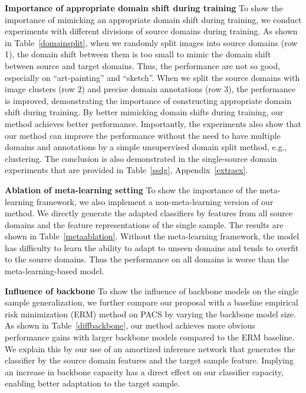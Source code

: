 \documentclass{article} \usepackage[table]{xcolor}
\begin{document}
\textbf{Importance of appropriate domain shift during training}
To show the importance of mimicking an appropriate domain shift during training, we conduct experiments with different divisions of source domains during training. 
As shown in Table~\ref{domainsplit}, when we randomly split images into source domains (row 1), the domain shift between them is too small to mimic the domain shift between source and target domains. Thus, the performance are not so good, especially on ``art-painting'' and ``sketch''.
When we split the source domains with image clusters (row 2) and precise domain annotations (row 3), the performance is improved,
demonstrating the importance of constructing appropriate domain shift during training.
By better mimicking domain shifts during training, our method achieves better performance.
Importantly, the experiments also show that our method can improve the performance without the need to have multiple domains and annotations by a simple unsupervised domain split method, e.g., clustering. 
The conclusion is also demonstrated in the single-source domain experiments that are provided in Table~\ref{ssdg}, Appendix~\ref{extraex}.




\textbf{Ablation of meta-learning setting}
To show the importance of the meta-learning framework, we also implement a non-meta-learning version of our method.
We directly generate the adapted classifiers by features from all source domains and the feature representations of the single sample. 
The results are shown in Table~\ref{metaablation}. Without the meta-learning framework, the model has difficulty to learn the ability to adapt to unseen domains and tends to overfit to the source domains. Thus the performance on all domains is worse than the meta-learning-based model.

\textbf{Influence of backbone}
To show the influence of backbone models on the single sample generalization, we further compare our proposal with a baseline empirical risk minimization (ERM) method on PACS by varying the backbone model size. 
As shown in Table~\ref{diffbackbone}, our method achieves more obvious performance gains with larger backbone models compared to the ERM baseline. 
We explain this by our use of an amortized inference network that generates the classifier by the source domain features and the target sample feature. Implying an increase in backbone capacity has a direct effect on our classifier capacity, enabling better adaptation to the target sample.
\end{document}
